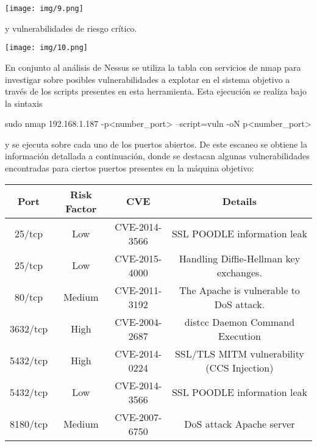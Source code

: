 \documentclass[12pt,oneside,a4paper]{book}
\begin{document}
\begin{center}
    \texttt{[image: img/9.png]}
\end{center}

\vspace{1em}

y vulnerabilidades de riesgo crítico.

\vspace{1em}

\begin{center}
    \texttt{[image: img/10.png]}
\end{center}

\vspace{1em}

\hspace{20pt}
En conjunto al análisis de Nessus se utiliza la tabla con servicios de nmap para investigar sobre posibles vulnerabilidades a explotar en el sistema objetivo a través de los scripts presentes en esta herramienta. Esta ejecución se realiza bajo la sintaxis

\vspace{1em}

\begin{center}
	sudo nmap 192.168.1.187 -p<number\_port> --script=vuln -oN p<number\_port>
\end{center}

\vspace{1em}

y se ejecuta sobre cada uno de los puertos abiertos. De este escaneo se obtiene la información detallada a continuación, donde se destacan algunas vulnerabilidades encontradas para ciertos puertos presentes en la máquina objetivo:

\vspace{1em}

\begin{table}[H]
    \centering
    \begin{tabular}{|c|c|c|c|}
         \hline
         \textbf{ Port } & \textbf{ Risk Factor } & \textbf{ CVE} & \textbf{ Details} \\
         \hline
         25/tcp & \cellcolor{Low}Low  & CVE-2014-3566 & SSL POODLE information leak\\
         \hline
         25/tcp & \cellcolor{Low}Low  & CVE-2015-4000 & Handling Diffie-Hellman key exchanges. \\
         \hline
         80/tcp & \cellcolor{Medium}Medium  & CVE-2011-3192 & The Apache is vulnerable to DoS attack. \\
         \hline
         3632/tcp & \cellcolor{High}High  & CVE-2004-2687 & distcc Daemon Command Execution \\
         \hline
         5432/tcp & \cellcolor{High}High  & CVE-2014-0224 & SSL/TLS MITM vulnerability (CCS Injection)\\
         \hline
         5432/tcp & \cellcolor{Low}Low  & CVE-2014-3566 & SSL POODLE information leak\\
         \hline
         8180/tcp & \cellcolor{Medium}Medium  & CVE-2007-6750 & DoS attack Apache server\\
         \hline
    \end{tabular}
\end{table}
\end{document}
